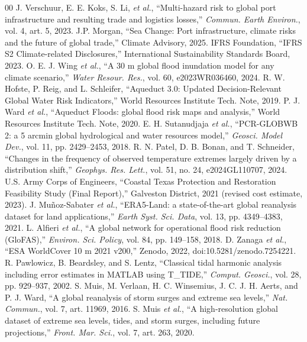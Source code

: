 \documentclass[11pt,a4paper]{article}
\begin{document}
\begin{thebibliography}{00}
 J. Verschuur, E. E. Koks, S. Li, \emph{et al.}, ``Multi-hazard risk to global port infrastructure and resulting trade and logistics losses,'' \emph{Commun. Earth Environ.}, vol. 4, art. 5, 2023.
 J.P. Morgan, ``Sea Change: Port infrastructure, climate risks and the future of global trade,'' Climate Advisory, 2025.
 IFRS Foundation, ``IFRS S2 Climate-related Disclosures,'' International Sustainability Standards Board, 2023.
 O. E. J. Wing \emph{et al.}, ``A 30 m global flood inundation model for any climate scenario,'' \emph{Water Resour. Res.}, vol. 60, e2023WR036460, 2024.
 R. W. Hofste, P. Reig, and L. Schleifer, ``Aqueduct 3.0: Updated Decision-Relevant Global Water Risk Indicators,'' World Resources Institute Tech. Note, 2019.
 P. J. Ward \emph{et al.}, ``Aqueduct Floods: global flood risk maps and analysis,'' World Resources Institute Tech. Note, 2020.
 E. H. Sutanudjaja \emph{et al.}, ``PCR-GLOBWB 2: a 5 arcmin global hydrological and water resources model,'' \emph{Geosci. Model Dev.}, vol. 11, pp. 2429--2453, 2018.
 R. N. Patel, D. B. Bonan, and T. Schneider, ``Changes in the frequency of observed temperature extremes largely driven by a distribution shift,'' \emph{Geophys. Res. Lett.}, vol. 51, no. 24, e2024GL110707, 2024.
 U.S. Army Corps of Engineers, ``Coastal Texas Protection and Restoration Feasibility Study (Final Report),'' Galveston District, 2021 (revised cost estimate, 2023).
 J. Mu\~noz-Sabater \emph{et al.}, ``ERA5-Land: a state-of-the-art global reanalysis dataset for land applications,'' \emph{Earth Syst. Sci. Data}, vol. 13, pp. 4349--4383, 2021.
 L. Alfieri \emph{et al.}, ``A global network for operational flood risk reduction (GloFAS),'' \emph{Environ. Sci. Policy}, vol. 84, pp. 149--158, 2018.
 D. Zanaga \emph{et al.}, ``ESA WorldCover 10 m 2021 v200,'' Zenodo, 2022, doi:10.5281/zenodo.7254221.
 R. Pawlowicz, B. Beardsley, and S. Lentz, ``Classical tidal harmonic analysis including error estimates in MATLAB using T\_TIDE,'' \emph{Comput. Geosci.}, vol. 28, pp. 929--937, 2002.
 S. Muis, M. Verlaan, H. C. Winsemius, J. C. J. H. Aerts, and P. J. Ward, ``A global reanalysis of storm surges and extreme sea levels,'' \emph{Nat. Commun.}, vol. 7, art. 11969, 2016.
 S. Muis \emph{et al.}, ``A high-resolution global dataset of extreme sea levels, tides, and storm surges, including future projections,'' \emph{Front. Mar. Sci.}, vol. 7, art. 263, 2020.

\end{thebibliography}
\end{document}
